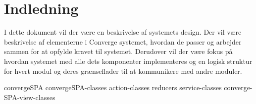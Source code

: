 \chapter{Indledning}

I dette dokument vil der være en beskrivelse af systemets design. Der vil være beskrivelse af elementerne i Converge systemet, hvordan de passer og arbejder sammen for at opfylde kravet til systemet.  Derudover vil der være fokus på hvordan systemet med alle dets komponenter implementeres og en logisk struktur for hvert modul og deres grænseflader til at kommunikere med andre moduler.  

{convergeSPA}  \newpage
{convergeSPA-classes}  \newpage
{action-classes}\newpage 
{reducers}\newpage 
{service-classes} \newpage
{converge-SPA-view-classes} 
